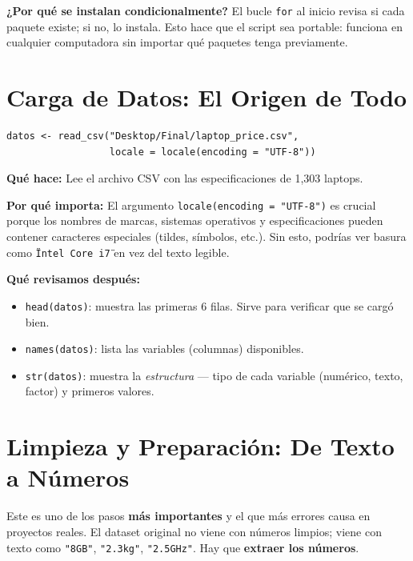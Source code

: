 \documentclass[12pt,a4paper]{article}
\begin{document}
\textbf{¿Por qué se instalan condicionalmente?} El bucle \texttt{for} al inicio revisa si cada paquete existe; si no, lo instala. Esto hace que el script sea portable: funciona en cualquier computadora sin importar qué paquetes tenga previamente.

\section{Carga de Datos: El Origen de Todo}

\begin{lstlisting}[caption={Lectura del dataset}]
datos <- read_csv("Desktop/Final/laptop_price.csv",
                  locale = locale(encoding = "UTF-8"))
\end{lstlisting}

\textbf{Qué hace:} Lee el archivo CSV con las especificaciones de 1,303 laptops.

\textbf{Por qué importa:} El argumento \texttt{locale(encoding = "UTF-8")} es crucial porque los nombres de marcas, sistemas operativos y especificaciones pueden contener caracteres especiales (tildes, símbolos, etc.). Sin esto, podrías ver basura como \texttt{\"Intel Core i7\"} en vez del texto legible.

\textbf{Qué revisamos después:}
\begin{itemize}
    \item \texttt{head(datos)}: muestra las primeras 6 filas. Sirve para verificar que se cargó bien.
    \item \texttt{names(datos)}: lista las variables (columnas) disponibles.
    \item \texttt{str(datos)}: muestra la \textit{estructura} --- tipo de cada variable (numérico, texto, factor) y primeros valores.
\end{itemize}

\section{Limpieza y Preparación: De Texto a Números}

Este es uno de los pasos \textbf{más importantes} y el que más errores causa en proyectos reales. El dataset original no viene con números limpios; viene con texto como \texttt{"8GB"}, \texttt{"2.3kg"}, \texttt{"2.5GHz"}. Hay que \textbf{extraer los números}.
\end{document}
